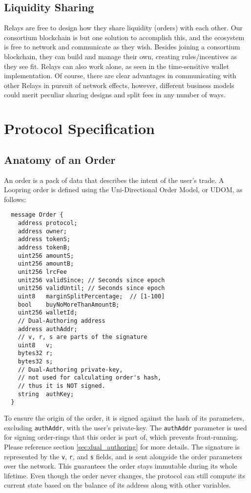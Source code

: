 \documentclass[UTF8,nofonts]{article}
\begin{document}
\begin{multicols}{2}
\subsection{Liquidity Sharing\label{sec:liquidity_sharing}}
Relays are free to design how they share liquidity (orders) with each other. Our consortium blockchain is but one solution to accomplish this, and the ecosystem is free to network and communicate as they wish. Besides joining a consortium blockchain, they can build and manage their own, creating rules/incentives as they see fit. Relays can also work alone, as seen in the time-sensitive wallet implementation. Of course, there are clear advantages in communicating with other Relays in pursuit of network effects, however, different business models could merit peculiar sharing designs and split fees in any number of ways.


\section{Protocol Specification\label{sec:protocol}}

\subsection{Anatomy of an Order\label{anatomy}}
An order is a pack of data that describes the intent of the user's trade. A Loopring order is defined using the Uni-Directional Order Model, or UDOM, as follows:

\begin{verbatim}
  message Order {
    address protocol;
    address owner;
    address tokenS;
    address tokenB;
    uint256 amountS;
    uint256 amountB;
    unit256 lrcFee
    unit256 validSince; // Seconds since epoch
    unit256 validUntil; // Seconds since epoch
    uint8   marginSplitPercentage;  // [1-100]
    bool    buyNoMoreThanAmountB;
    uint256 walletId;
    // Dual-Authoring address
    address authAddr;
   	// v, r, s are parts of the signature
    uint8   v;       
    bytes32 r;
    bytes32 s;
    // Dual-Authoring private-key,
    // not used for calculating order's hash,
    // thus it is NOT signed.
    string  authKey;          
  }
\end{verbatim}


To ensure the origin of the order, it is signed against the hash of its parameters, excluding \verb|authAddr|, with the user's private-key. The \verb|authAddr| parameter is used for signing  order-rings that this order is part of, which prevents front-running. Please reference section \ref{sec:dual_authoring} for more details. The signature is represented by the \verb|v|, \verb|r|, and \verb|s| fields, and is sent alongside the order parameters over the network. This guarantees the order stays immutable during its whole lifetime. Even though the order never changes, the protocol can still compute its current state based on the balance of its address along with other variables.




\end{multicols}
\end{document}
